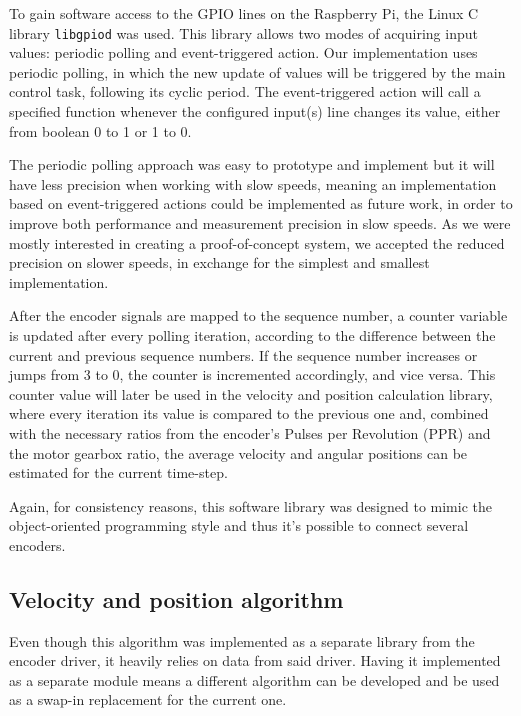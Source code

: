 To gain software access to the GPIO lines on the Raspberry Pi, the Linux C library \verb|libgpiod| \cite{lib:libgpiod} was used.
This library allows two modes of acquiring input values: periodic polling and event-triggered action.
Our implementation uses periodic polling, in which the new update of values will be triggered by the main control task, following its cyclic period.
The event-triggered action will call a specified function whenever the configured input(s) line changes its value, either from boolean 0 to 1 or 1 to 0.

The periodic polling approach was easy to prototype and implement but it will have less precision when working with slow speeds, meaning an implementation based on event-triggered actions could be implemented as future work, in order to improve both performance and measurement precision in slow speeds.
As we were mostly interested in creating a proof-of-concept system, we accepted the reduced precision on slower speeds, in exchange for the simplest and smallest implementation.

After the encoder signals are mapped to the sequence number, a counter variable is updated after every polling iteration, according to the difference between the current and previous sequence numbers.
If the sequence number increases or jumps from 3 to 0, the counter is incremented accordingly, and vice versa.
This counter value will later be used in the velocity and position calculation library, where every iteration its value is compared to the previous one and, combined with the necessary ratios from the encoder's Pulses per Revolution (PPR) and the motor gearbox ratio, the average velocity and angular positions can be estimated for the current time-step.

Again, for consistency reasons, this software library was designed to mimic the object-oriented programming style and thus it's possible to connect several encoders.

\subsection{Velocity and position algorithm}
Even though this algorithm was implemented as a separate library from the encoder driver, it heavily relies on data from said driver.
Having it implemented as a separate module means a different algorithm can be developed and be used as a swap-in replacement for the current one.

